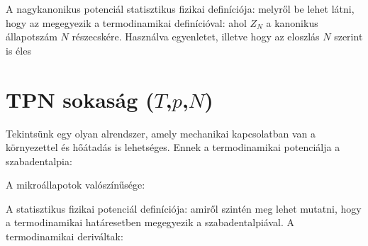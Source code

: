    A nagykanonikus potenciál statisztikus fizikai definíciója:
   melyről be lehet látni, hogy az megegyezik a termodinamikai definícióval:
   ahol $Z_N$ a kanonikus állapotszám $N$ részecskére.
   Használva  egyenletet, illetve hogy az eloszlás $N$ szerint is éles
   
 \section{TPN sokaság ($T$,$p$,$N$)}
  
  Tekintsünk egy olyan alrendszer, amely mechanikai kapcsolatban van a környezettel és hőátadás is lehetséges.
   Ennek a termodinamikai potenciálja a szabadentalpia:
  
  A mikroállapotok valószínűsége:
  
  A statisztikus fizikai potenciál definíciója:
  amiről szintén meg lehet mutatni, hogy a termodinamikai határesetben megegyezik a szabadentalpiával.
   A termodinamikai deriváltak:
